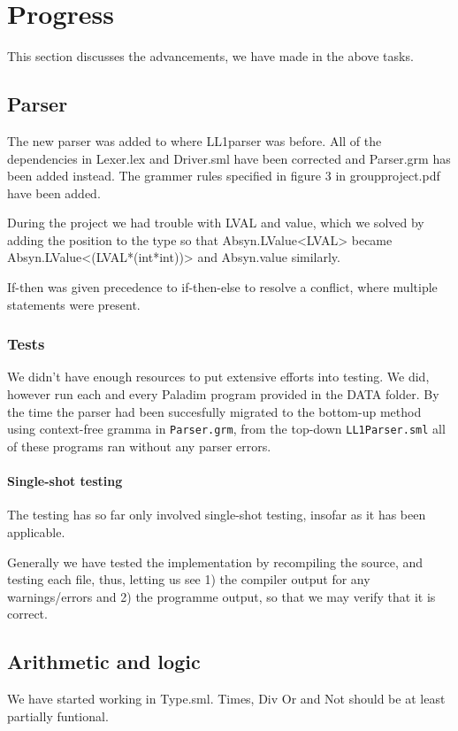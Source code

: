 \documentclass[11pt]{article}
\begin{document}
\section{Progress}
This section discusses the advancements, we have made in the above tasks.

\subsection{Parser}
The new parser was added to where LL1parser was before.
All of the dependencies in Lexer.lex and Driver.sml have been corrected and Parser.grm has been added instead.
The grammer rules specified in figure 3 in groupproject.pdf have been added.

During the project we had trouble with LVAL and value, which we solved by adding the position to the type
so that Absyn.LValue<LVAL> became Absyn.LValue<(LVAL*(int*int))> and Absyn.value similarly.

If-then was given precedence to if-then-else to resolve a conflict, where multiple statements were present.

\subsubsection{Tests}
We didn't have enough resources to put extensive efforts into testing. We did,
however run each and every Paladim program provided in the DATA folder. By the
time the parser had been succesfully migrated to the bottom-up method using
context-free gramma in {\tt Parser.grm}, from the top-down {\tt LL1Parser.sml}
all of these programs ran without any parser errors.

\paragraph{Single-shot testing}
The testing has so far only involved single-shot testing, insofar as it has
been applicable.

Generally we have tested the implementation by recompiling the source, and
testing each file, thus, letting us see 1) the compiler output for any
warnings/errors and 2) the programme output, so that we may verify that it
is correct.

\subsection{Arithmetic and logic}
We have started working in Type.sml. Times, Div Or and Not should be at least partially funtional.
\end{document}
